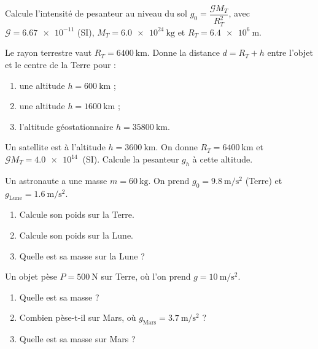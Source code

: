 \documentclass[11pt,a4paper]{article}
\begin{document}

\begin{exo}
Calcule l'intensité de pesanteur au niveau du sol $g_0=\dfrac{\mathcal{G}M_T}{R_T^2}$,
avec $\mathcal{G}=\num{6.67e-11}$ (SI), $M_T=\qty{6.0e24}{\kilogram}$ et
$R_T=\qty{6.4e6}{\metre}$.
\end{exo}

\begin{exo}
Le rayon terrestre vaut $R_T=\qty{6400}{\kilo\metre}$. Donne la distance $d=R_T+h$
entre l'objet et le centre de la Terre pour :
\begin{enumerate}[label=\alph*)]
  \item une altitude $h=\qty{600}{\kilo\metre}$ ;
  \item une altitude $h=\qty{1600}{\kilo\metre}$ ;
  \item l'altitude géostationnaire $h=\qty{35800}{\kilo\metre}$.
\end{enumerate}
\end{exo}

\begin{exo}
Un satellite est à l'altitude $h=\qty{3600}{\kilo\metre}$. On donne
$R_T=\qty{6400}{\kilo\metre}$ et $\mathcal{G}M_T=\qty{4.0e14}{}$ (SI).
Calcule la pesanteur $g_h$ à cette altitude.
\end{exo}

\begin{exo}
Un astronaute a une masse $m=\qty{60}{\kilogram}$. On prend
$g_0=\qty{9.8}{\metre\per\second\squared}$ (Terre) et
$g_{\text{Lune}}=\qty{1.6}{\metre\per\second\squared}$.
\begin{enumerate}[label=\alph*)]
  \item Calcule son poids sur la Terre.
  \item Calcule son poids sur la Lune.
  \item Quelle est sa masse sur la Lune ?
\end{enumerate}
\end{exo}

\begin{exo}
Un objet pèse $P=\qty{500}{\newton}$ sur Terre, où l'on prend
$g=\qty{10}{\metre\per\second\squared}$.
\begin{enumerate}[label=\alph*)]
  \item Quelle est sa masse ?
  \item Combien pèse-t-il sur Mars, où $g_{\text{Mars}}=\qty{3.7}{\metre\per\second\squared}$ ?
  \item Quelle est sa masse sur Mars ?
\end{enumerate}
\end{exo}
\end{document}
